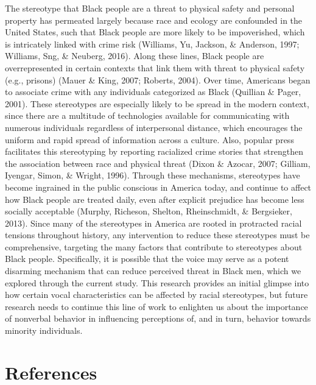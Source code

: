 \documentclass[
  english,
  man]{apa6}
\begin{document}
The stereotype that Black people are a threat to physical safety and personal property has permeated largely because race and ecology are confounded in the United States, such that Black people are more likely to be impoverished, which is intricately linked with crime risk (Williams, Yu, Jackson, \& Anderson, 1997; Williams, Sng, \& Neuberg, 2016). Along these lines, Black people are overrepresented in certain contexts that link them with threat to physical safety (e.g., prisons) (Mauer \& King, 2007; Roberts, 2004). Over time, Americans began to associate crime with any individuals categorized as Black (Quillian \& Pager, 2001). These stereotypes are especially likely to be spread in the modern context, since there are a multitude of technologies available for communicating with numerous individuals regardless of interpersonal distance, which encourages the uniform and rapid spread of information across a culture. Also, popular press facilitates this stereotyping by reporting racialized crime stories that strengthen the association between race and physical threat (Dixon \& Azocar, 2007; Gilliam, Iyengar, Simon, \& Wright, 1996). Through these mechanisms, stereotypes have become ingrained in the public conscious in America today, and continue to affect how Black people are treated daily, even after explicit prejudice has become less socially acceptable (Murphy, Richeson, Shelton, Rheinschmidt, \& Bergsieker, 2013). Since many of the stereotypes in America are rooted in protracted racial tensions throughout history, any intervention to reduce these stereotypes must be comprehensive, targeting the many factors that contribute to stereotypes about Black people. Specifically, it is possible that the voice may serve as a potent disarming mechanism that can reduce perceived threat in Black men, which we explored through the current study. This research provides an initial glimpse into how certain vocal characteristics can be affected by racial stereotypes, but future research needs to continue this line of work to enlighten us about the importance of nonverbal behavior in influencing perceptions of, and in turn, behavior towards minority individuals.

\newpage

\hypertarget{references}{%
\section{References}\label{references}}

\begingroup
\setlength{\parindent}{-0.5in}
\setlength{\leftskip}{0.5in}
\end{document}
